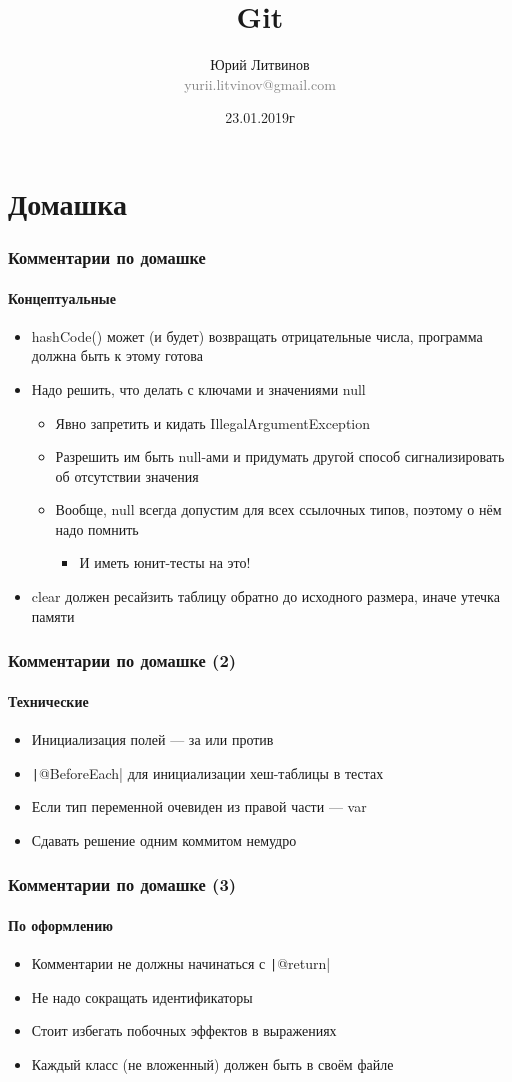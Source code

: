 \documentclass[xetex,mathserif,serif]{beamer}
\title{Git}
\author[Юрий Литвинов]{Юрий Литвинов\\\small{\textcolor{gray}{yurii.litvinov@gmail.com}}}
\date{23.01.2019г}
\begin{document}
	\frame{\titlepage}

	\section{Домашка}

	\begin{frame}
		\frametitle{Комментарии по домашке}
		\framesubtitle{Концептуальные}
		\begin{itemize}
			\item hashCode() может (и будет) возвращать отрицательные числа, программа должна быть к этому готова
			\item Надо решить, что делать с ключами и значениями null
			\begin{itemize}
				\item Явно запретить и кидать IllegalArgumentException
				\item Разрешить им быть null-ами и придумать другой способ сигнализировать об отсутствии значения
				\item Вообще, null всегда допустим для всех ссылочных типов, поэтому о нём надо помнить
				\begin{itemize}
					\item И иметь юнит-тесты на это!
				\end{itemize}
			\end{itemize}
			\item clear должен ресайзить таблицу обратно до исходного размера, иначе утечка памяти
		\end{itemize}
	\end{frame}

	\begin{frame}
		\frametitle{Комментарии по домашке (2)}
		\framesubtitle{Технические}
		\begin{itemize}
			\item Инициализация полей --- за или против
			\item \texttt|@BeforeEach| для инициализации хеш-таблицы в тестах
			\item Если тип переменной очевиден из правой части --- var
			\item Сдавать решение одним коммитом немудро
		\end{itemize}
	\end{frame}

	\begin{frame}
		\frametitle{Комментарии по домашке (3)}
		\framesubtitle{По оформлению}
		\begin{itemize}
			\item Комментарии не должны начинаться с \texttt|@return|
			\item Не надо сокращать идентификаторы
			\item Стоит избегать побочных эффектов в выражениях
			\item Каждый класс (не вложенный) должен быть в своём файле
		\end{itemize}
	\end{frame}
\end{document}
